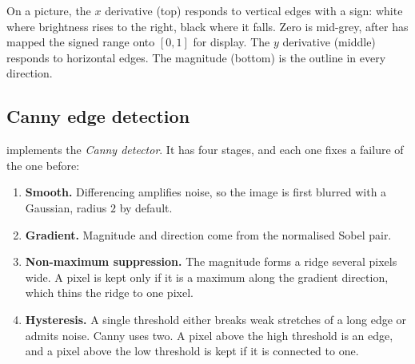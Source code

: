 On a picture, the \(x\) derivative (top) responds to vertical edges with a sign:
white where brightness rises to the right, black where it falls. Zero is mid-grey,
after  has mapped the signed range onto \([0,1]\) for display.
The \(y\) derivative (middle) responds to horizontal edges. The magnitude (bottom)
is the outline in every direction.


\subsection{Canny edge detection}

 implements the \emph{Canny detector}. It
has four stages, and each one fixes a failure of the one before:

\begin{enumerate}
\item \textbf{Smooth.} Differencing amplifies noise, so the image is first blurred
with a Gaussian, radius \(2\) by default.
\item \textbf{Gradient.} Magnitude and direction come from the normalised Sobel
pair.
\item \textbf{Non-maximum suppression.} The magnitude forms a ridge several pixels
wide. A pixel is kept only if it is a maximum along the gradient direction, which
thins the ridge to one pixel.
\item \textbf{Hysteresis.} A single threshold either breaks weak stretches of a
long edge or admits noise. Canny uses two. A pixel above the high threshold is an
edge, and a pixel above the low threshold is kept if it is connected to one.
\end{enumerate}

\begin{codepairs}
\end{codepairs}


